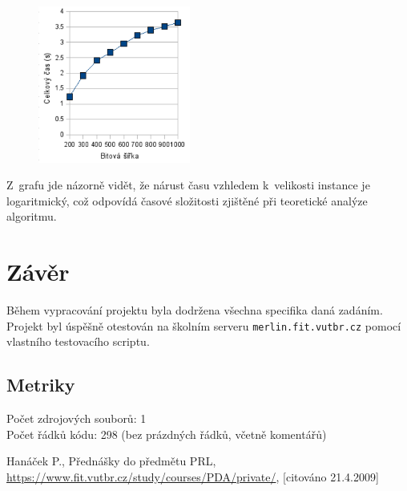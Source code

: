 \documentclass[11pt,a4paper]{article}
\begin{document}
\begin{figure}[ht]
	\begin{center}
		\includegraphics[width=5.0cm,keepaspectratio]{graph}
	\end{center}
\end{figure}

\noindent
Z~grafu jde názorně vidět, že nárust času vzhledem k~velikosti instance je
logaritmický, což odpovídá časové složitosti zjištěné při teoretické analýze algoritmu.

\section{Závěr}

Během vypracování projektu byla dodržena všechna specifika daná zadáním.
Projekt byl úspěšně otestován na školním serveru \texttt{merlin.fit.vutbr.cz}
pomocí vlastního testovacího scriptu.

\subsection*{Metriky}

\noindent
Počet zdrojových souborů: 1 \\
Počet řádků kódu: 298 (bez prázdných řádků, včetně komentářů)

\begin{thebibliography}{77}
\small
{} Hanáček P., Přednášky do předmětu PRL, \url{https://www.fit.vutbr.cz/study/courses/PDA/private/}, [citováno 21.4.2009]
\end{thebibliography}
\end{document}

